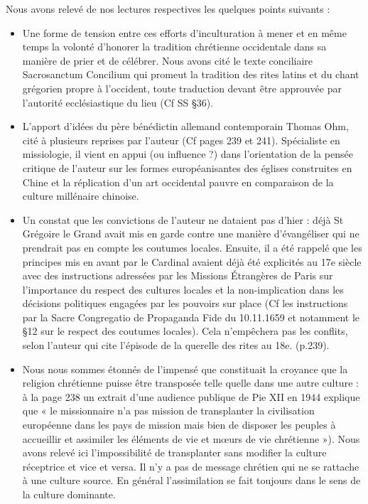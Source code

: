 Nous avons relevé de nos lectures respectives les quelques points suivants :
\begin{itemize}
    \item Une forme de tension entre ces efforts d’inculturation à mener et en même temps la volonté d’honorer la tradition chrétienne occidentale dans sa manière de prier et de célébrer. Nous avons cité le texte conciliaire Sacrosanctum Concilium qui promeut la tradition des rites latins et du chant grégorien propre à l’occident, toute traduction devant être approuvée par l’autorité ecclésiastique du lieu (Cf SS §36).
        \item L’apport d’idées du père bénédictin allemand contemporain Thomas Ohm, cité à plusieurs reprises par l’auteur (Cf pages 239 et 241). Spécialiste en missiologie, il vient en appui (ou influence ?) dans l’orientation de la pensée critique de l’auteur sur les formes européanisantes des églises construites en Chine et la réplication d’un art occidental pauvre en comparaison de la culture millénaire chinoise.

            \item Un constat que les convictions de l’auteur ne dataient pas d’hier : déjà St Grégoire le Grand avait mis en garde contre une manière d’évangéliser qui ne prendrait pas en compte les coutumes locales. Ensuite, il a été rappelé que les principes mis en avant par le Cardinal avaient déjà été explicités au 17e siècle avec des instructions adressées par les Missions Étrangères de Paris sur l’importance du respect des cultures locales et la non-implication dans les décisions politiques engagées par les pouvoirs sur place (Cf les instructions par la Sacre Congregatio de Propaganda Fide du 10.11.1659 et notamment le §12 sur le respect des coutumes locales). Cela n’empêchera pas les conflits, selon l’auteur qui cite l’épisode de la querelle des rites au 18e. (p.239).

                \item Nous nous sommes étonnés de l’impensé que constituait la croyance que la religion chrétienne puisse être transposée telle quelle dans une autre culture : à la page 238 un extrait d’une audience publique de Pie XII en 1944 explique que « le missionnaire n’a pas mission de transplanter la civilisation européenne dans les pays de mission mais bien de disposer les peuples à accueillir et assimiler les éléments de vie et mœurs de vie chrétienne »). Nous avons relevé ici l’impossibilité de transplanter sans modifier la culture réceptrice et vice et versa. Il n’y a pas de message chrétien qui ne se rattache à une culture source. En général l’assimilation se fait toujours dans le sens de la culture dominante.

\end{itemize}
 


